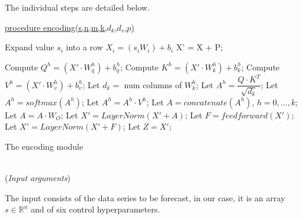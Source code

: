 \documentclass[algorithms,article,submit,pdftex,moreauthors]{Definitions/mdpi}
\begin{document}
The individual steps are detailed below.

\begin{algorithm2e}

        \underline{procedure encoding(s,n,m,k,$d_k$,$d_v$,$p$)} \label{algo:encoding}
        
        
        {\label{enc:seca1}
            Expand value $s_i$ into a row $X_i = (s_iW_i) + b_i$
        }   \label{enc:seca2}
        X' = X + P;\; \label{enc:positional}
        
	{ \label{enc:encoding-block1}
            {	\label{enc:multihead1}
                Compute $Q^h=(X'\cdot W_q^h) + b_q^h$;\; \label{enc:qh}
                Compute $K^h=(X'\cdot W_k^h) + b_k^h$;\; \label{enc:kh}
                Compute $V^h=(X'\cdot W_v^h) + b_v^h$;\; \label{enc:vh}
                Let $d_k=$ num columns of $W^h_k$;\; \label{enc:dk}
                Let $A^h = \dfrac{Q \cdot K^T}{\sqrt{d_k}}$;  \label{enc:attention1}
                Let $A^h = softmax\left(A^h\right)$;  \label{enc:softmax}
                Let $A^h = A^h\cdot V^h$;  \label{enc:attention2}
            } \label{enc:multihead2}
            Let $A=concatenate(A^h)$, $h=0,\dots,k$;\; \label{enc:concatenation}
            Let $A = A \cdot W_O$;  \label{enc:outproj} 
            Let $X' = LayerNorm(X' + A)$;\; \label{enc:addnorm1}
            Let $F = feedforward(X')$;  \label{enc:ffn}
            Let $X' = LayerNorm(X' + F)$;\; \label{enc:addnorm2}
        }   \label{enc:encoding-block2}                  
        Let $Z = X'$; \label{enc:output}
	\caption{The encoding module}
\end{algorithm2e}

~\\(\textit{Input arguments})

The input consists of the data series to be forecast, in our case, it is an array $s \in \mathbb{R}^n$ and of six control hyperparameters.
\end{document}

